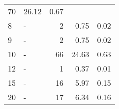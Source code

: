 \begin{longtable}{lXrrr}
       \num{70} &
       \num[round-mode=places,round-precision=2]{26.12} &
         \num[round-mode=places,round-precision=2]{0.67} \\

     8 &
     \multicolumn{1}{X}{ -  } &


       \num{2} &
       \num[round-mode=places,round-precision=2]{0.75} &
         \num[round-mode=places,round-precision=2]{0.02} \\

     9 &
     \multicolumn{1}{X}{ -  } &


       \num{2} &
       \num[round-mode=places,round-precision=2]{0.75} &
         \num[round-mode=places,round-precision=2]{0.02} \\

     10 &
     \multicolumn{1}{X}{ -  } &


       \num{66} &
       \num[round-mode=places,round-precision=2]{24.63} &
         \num[round-mode=places,round-precision=2]{0.63} \\

     12 &
     \multicolumn{1}{X}{ -  } &


       \num{1} &
       \num[round-mode=places,round-precision=2]{0.37} &
         \num[round-mode=places,round-precision=2]{0.01} \\

     15 &
     \multicolumn{1}{X}{ -  } &


       \num{16} &
       \num[round-mode=places,round-precision=2]{5.97} &
         \num[round-mode=places,round-precision=2]{0.15} \\

     20 &
     \multicolumn{1}{X}{ -  } &


       \num{17} &
       \num[round-mode=places,round-precision=2]{6.34} &
         \num[round-mode=places,round-precision=2]{0.16} \\


\end{longtable}
